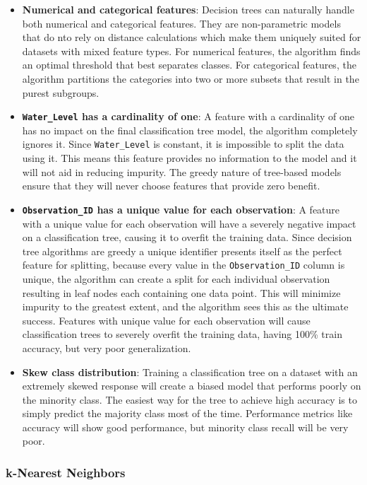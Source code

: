 \documentclass[conference]{IEEEtran}
\begin{document}
\begin{itemize}
    \item \textbf{Numerical and categorical features}: Decision trees can naturally handle both numerical and categorical features. They are non-parametric models that do nto rely on distance calculations which make them uniquely suited for datasets with mixed feature types. For numerical features, the algorithm finds an optimal threshold that best separates classes. For categorical features, the algorithm partitions the categories into two or more subsets that result in the purest subgroups.
    \item \textbf{\texttt{Water\_Level} has a cardinality of one}: A feature with a cardinality of one has no impact on the final classification tree model, the algorithm completely ignores it. Since \texttt{Water\_Level} is constant, it is impossible to split the data using it. This means this feature provides no information to the model and it will not aid in reducing impurity. The greedy nature of tree-based models ensure that they will never choose features that provide zero benefit.
    \item \textbf{\texttt{Observation\_ID} has a unique value for each observation}: A feature with a unique value for each observation will have a severely negative impact on a classification tree, causing it to overfit the training data. Since decision tree algorithms are greedy a unique identifier presents itself as the perfect feature for splitting, because every value in the \texttt{Observation\_ID} column is unique, the algorithm can create a split for each individual observation resulting in leaf nodes each containing one data point. This will minimize impurity to the greatest extent, and the algorithm sees this as the ultimate success. Features with unique value for each observation will cause classification trees to severely overfit the training data, having 100\% train accuracy, but very poor generalization.
    \item \textbf{Skew class distribution}: Training a classification tree on a dataset with an extremely skewed response will create a biased model that performs poorly on the minority class. The easiest way for the tree to achieve high accuracy is to simply predict the majority class most of the time. Performance metrics like accuracy will show good performance, but minority class recall will be very poor.
\end{itemize}

\subsubsection{\textbf{k-Nearest Neighbors}}
\end{document}
